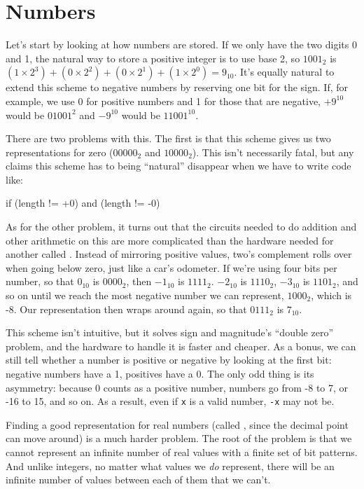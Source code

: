 \section{Numbers}

Let's start by looking at how numbers are stored. If we only have the
two digits 0 and 1, the natural way to store a positive integer is to
use base 2, so $1001_{2}$ is
$(1×2^{3})+(0×2^{2})+(0×2^{1})+(1×2^{0}) = 9_{10}$.
It's equally natural to extend this scheme to
negative numbers by reserving one bit for the sign. If, for example, we
use 0 for positive numbers and 1 for those that are negative,
$+9^{10}$ would be $01001^{2}$ and
$-9^{10}$ would be $11001^{10}$.

There are two problems with this. The first is that this scheme gives us
two representations for zero ($00000_{2}$ and
$10000_{2}$). This isn't necessarily fatal, but any claims
this scheme has to being ``natural'' disappear when we have to write
code like:

\begin{VerbIn}
if (length != +0) and (length != -0)
\end{VerbIn}

As for the other problem, it turns out that the circuits needed to do
addition and other arithmetic on this
 are
more complicated than the hardware needed for another called
. Instead of mirroring
positive values, two's complement rolls over when going below zero, just
like a car's odometer. If we're using four bits per number, so that
$0_{10}$ is $0000_{2}$, then $-1_{10}$
is $1111_{2}$. $-2_{10}$ is $1110_{2}$,
$-3_{10}$ is $1101_{2}$, and so on until we reach
the most negative number we can represent, $1000_{2}$, which
is -8. Our representation then wraps around again, so that
$0111_{2}$ is $7_{10}$.

This scheme isn't intuitive, but it solves sign and magnitude's ``double
zero'' problem, and the hardware to handle it is faster and cheaper. As
a bonus, we can still tell whether a number is positive or negative by
looking at the first bit: negative numbers have a 1, positives have a 0.
The only odd thing is its asymmetry: because 0 counts as a positive
number, numbers go from -8 to 7, or -16 to 15, and so on. As a result,
even if \texttt{x} is a valid number, \texttt{-x} may not be.

Finding a good representation for real numbers (called
, since the decimal
point can move around) is a much harder problem. The root of the problem
is that we cannot represent an infinite number of real values with a
finite set of bit patterns. And unlike integers, no matter what values
we \emph{do} represent, there will be an infinite number of values
between each of them that we can't.

